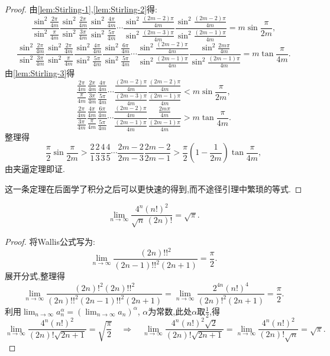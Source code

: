 \begin{proof}
    由\autoref{lem:Stirling-1},\autoref{lem:Stirling-2}得:
    $$\frac{\sin^2\frac{2\pi}{4m}}{\sin^2\frac{\pi}{4m}}\frac{\sin^2\frac{2\pi}{4m}}{\sin^2\frac{3\pi}{4m}}\frac{\sin^2\frac{4\pi}{4m}}{\sin^2\frac{5\pi}{4m}}\cdots\frac{\sin^2\frac{(2m-2)\pi}{4m}}{\sin^2\frac{(2m-3)\pi}{4m}}\frac{\sin^2\frac{(2m-2)\pi}{4m}}{\sin^2\frac{(2m-1)\pi}{4m}} = m\sin\frac{\pi}{2m}, $$
    $$\frac{\sin^2\frac{2\pi}{4m}}{\sin^2\frac{3\pi}{4m}}\frac{\sin^2\frac{2\pi}{4m}}{\sin^2\frac{\pi}{4m}}\frac{\sin^2\frac{4\pi}{4m}}{\sin^2\frac{5\pi}{4m}}\frac{\sin^2\frac{6\pi}{4m}}{\sin^2\frac{5\pi}{4m}}\cdots\frac{\sin^2\frac{(2m-2)\pi}{4m}}{\sin^2\frac{(2m-1)\pi}{4m}}\frac{\sin^2\frac{2m\pi}{4m}}{\sin^2\frac{(2m-1)\pi}{4m}} = m\tan\frac{\pi}{4m}.$$
    由\autoref{lem:Stirling-3}得
    $$\frac{\frac{2\pi}{4m}}{\frac{\pi}{4m}}\frac{\frac{2\pi}{4m}}{\frac{3\pi}{4m}}\frac{\frac{4\pi}{4m}}{\frac{5\pi}{4m}}\cdots\frac{\frac{(2m-2)\pi}{4m}}{\frac{(2m-3)\pi}{4m}}\frac{\frac{(2m-2)\pi}{4m}}{\frac{(2m-1)\pi}{4m}} < m\sin\frac{\pi}{2m}, $$
    $$\frac{\frac{2\pi}{4m}}{\frac{3\pi}{4m}}\frac{\frac{4\pi}{4m}}{\frac{\pi}{4m}}\frac{\frac{6\pi}{4m}}{\frac{5\pi}{4m}}\cdots\frac{\frac{(2m-2)\pi}{4m}}{\frac{(2m-1)\pi}{4m}}\frac{\frac{2m\pi}{4m}}{\frac{(2m-1)\pi}{4m}} > m\tan\frac{\pi}{4m}.$$
    整理得$$\frac{\pi}{2}\sin\frac{\pi}{2m} > \frac{2}{1}\frac{2}{3}\frac{4}{3}\frac{4}{5}\cdots\frac{2m-2}{2m-3}\frac{2m-2}{2m-1} > \frac{\pi}{2}\left(1-\frac{1}{2m}\right)\tan\frac{\pi}{4m},
    $$由夹逼定理即证.

    这一条定理在后面学了积分之后可以更快速的得到,而不途径引理中繁琐的等式.
\end{proof}

\begin{lemma}\label{lem:Stirling-5}
    $$\lim_{n \to \infty} \frac{4^n (n!)^2}{\sqrt{n}\,(2n)!} = \sqrt{\pi}.$$
\end{lemma}

\begin{proof}
    将Wallis公式写为:
    \[
        \lim_{n \to \infty} \frac{(2n)!!^2}{(2n-1)!!^2 (2n+1)} = \frac{\pi}{2}.
    \]
    展开分式,整理得\[
        \lim_{n \to \infty} \frac{(2n)!^2 (2n)!!^2}{(2n)!!^2 (2n-1)!!^2 (2n+1)}
        = \lim_{n \to \infty} \frac{2^{4n} (n!)^4}{(2n)!^2 (2n+1)} = \frac{\pi}{2}.
    \]
    利用$\lim_{n \to \infty} a_n^\alpha = \left( \lim_{n \to \infty} a_n \right)^\alpha$, $\alpha$为常数,此处$\alpha$取$\frac{1}{2}$,得
    \[
        \lim_{n \to \infty} \frac{4^n (n!)^2}{(2n)! \sqrt{2n+1}}
        = \sqrt{\frac{\pi}{2}}
        \quad \Rightarrow \quad
        \lim_{n \to \infty} \frac{4^n (n!)^2 \sqrt{2}}{(2n)! \sqrt{2n+1}}
        = \lim_{n \to \infty} \frac{4^n (n!)^2}{(2n)! \sqrt{n}} = \sqrt{\pi}.
    \]

\end{proof}


